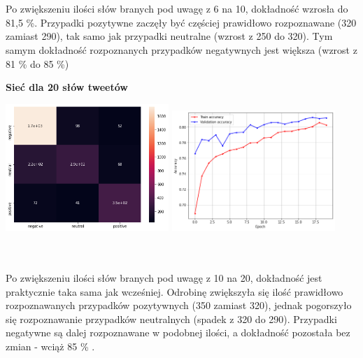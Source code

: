 \documentclass[11pt, a4paper, notitlepage]{report}
\begin{document}
\\ \\
Po zwiększeniu ilości słów branych pod uwagę z 6 na 10, dokładność wzrosła do 81,5 \%. Przypadki pozytywne zaczęły być częściej prawidłowo rozpoznawane (320 zamiast 290), tak samo jak przypadki neutralne (wzrost z 250 do 320). Tym samym dokładność rozpoznanych przypadków negatywnych jest większa (wzrost z 81 \% do 85 \%)
\newpage

 {\bf Sieć dla 20 słów tweetów}
\begin{center}
\includegraphics[width=175pt]{graphics/heatmap_LSTM_20_slow.png}
\includegraphics[width=175pt]{graphics/accuracy_LSTM_20_slow.png}
\end{center}
\\ \\
Po zwiększeniu ilości słów branych pod uwagę z 10 na 20, dokładność jest praktycznie taka sama jak wcześniej. Odrobinę zwiększyła się ilość prawidłowo rozpoznawanych przypadków pozytywnych (350 zamiast 320), jednak pogorszyło się rozpoznawanie przypadków neutralnych (spadek z 320 do 290). Przypadki negatywne są dalej rozpoznawane w podobnej ilości, a dokładność pozostała bez zmian - wciąż  85 \% .
\end{document}
